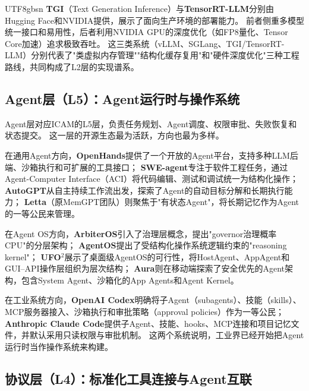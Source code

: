 \documentclass[11pt,a4paper]{article}
\begin{document}
\begin{CJK*}{UTF8}{gbsn}
\textbf{TGI}（Text Generation Inference）与\textbf{TensorRT-LLM}分别由Hugging Face和NVIDIA提供，展示了面向生产环境的部署能力\cite{tgi_docs_2026,tensorrtllm_docs_2026}。
前者侧重多模型统一接口和易用性，后者利用NVIDIA GPU的深度优化（如FP8量化、Tensor Core加速）追求极致吞吐。
这三类系统（vLLM、SGLang、TGI/TensorRT-LLM）分别代表了"类虚拟内存管理""结构化缓存复用"和"硬件深度优化"三种工程路线，共同构成了L2层的实现谱系。

\subsection{Agent层（L5）：Agent运行时与操作系统}

Agent层对应ICAM的L5层，负责任务规划、Agent调度、权限审批、失败恢复和状态提交。
这一层的开源生态最为活跃，方向也最为多样。

在通用Agent方向，\textbf{OpenHands}提供了一个开放的Agent平台，支持多种LLM后端、沙箱执行和可扩展的工具接口\cite{openhands_paper_2025}；
\textbf{SWE-agent}专注于软件工程任务，通过Agent-Computer Interface（ACI）将代码编辑、测试和调试统一为结构化操作\cite{sweagent2024}；
\textbf{AutoGPT}从自主持续工作流出发，探索了Agent的自动目标分解和长期执行能力\cite{autogpt_platform_2026}；
\textbf{Letta}（原MemGPT团队）则聚焦于"有状态Agent"，将长期记忆作为Agent的一等公民来管理\cite{letta_stateful_2026}。

在Agent OS方向，\textbf{ArbiterOS}引入了治理层概念，提出"governor治理概率CPU"的分层架构\cite{arbiteros2025}；
\textbf{AgentOS}提出了受结构化操作系统逻辑约束的"reasoning kernel"\cite{agentos2025}；
\textbf{UFO$^2$}展示了桌面级AgentOS的可行性，将HostAgent、AppAgent和GUI--API操作层组织为层次结构\cite{ufo2_2025}；
\textbf{Aura}则在移动端探索了安全优先的Agent架构，包含System Agent、沙箱化的App Agents和Agent Kernel\cite{aura2025}。

在工业系统方向，\textbf{OpenAI Codex}明确将子Agent（subagents）、技能（skills）、MCP服务器接入、沙箱执行和审批策略（approval policies）作为一等公民\cite{openai_codex_overview_2026,openai_codex_subagents_2026,openai_codex_skills_2026,openai_codex_sandbox_2026,openai_codex_approvals_2026}；
\textbf{Anthropic Claude Code}提供子Agent、技能、hooks、MCP连接和项目记忆文件，并默认采用只读权限与审批机制\cite{anthropic_claudecode_overview_2026,anthropic_claudecode_security_2026}。
这两个系统说明，工业界已经开始把Agent运行时当作操作系统来构建。

\subsection{协议层（L4）：标准化工具连接与Agent互联}


\end{CJK*}
\end{document}
